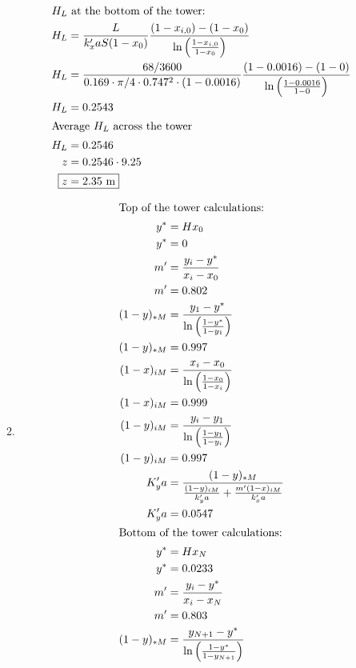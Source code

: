\documentclass[12pt]{article}
\begin{document}
\begin{enumerate}
\begin{enumerate}
\begin{align*}
            \intertext{$H_L$ at the bottom of the tower:}
            H_L &= \frac{L}{k_x'a S (1 - x_0)} \frac{(1 - x_{i,0}) - (1 - x_0)}{\ln\left(\frac{1 - x_{i,0}}{1 - x_0}\right)} \\
            H_L &= \frac{68 / 3600}{0.169 \cdot \pi/4 \cdot 0.747^2 \cdot (1 - 0.0016)} \frac{(1 - 0.0016) - (1 - 0)}{\ln\left(\frac{1 - 0.0016}{1 - 0}\right)} \\
            H_L &= 0.2543 \\
            \intertext{Average $H_L$ across the tower}
            H_L &= 0.2546 \\
            z &= 0.2546 \cdot 9.25 \\
            \Aboxed{z &= 2.35 \text{ m}}
        \end{align*}

        \item 
        \begin{align*}
            \intertext{Top of the tower calculations:}
            y^* &= H x_0 \\
            y^* &= 0 \\
            m' &= \frac{y_i - y^*}{x_i - x_0} \\
            m' &= 0.802 \\
            (1 - y)_{*M} &= \frac{y_1 - y^*}{\ln\left(\frac{1-y^*}{1-y_1}\right)} \\
            (1 - y)_{*M} &= 0.997 \\
            (1 - x)_{iM} &= \frac{x_i - x_0}{\ln\left(\frac{1-x_0}{1-x_i}\right)} \\
            (1 - x)_{iM} &= 0.999 \\
            (1 - y)_{iM} &= \frac{y_i - y_1}{\ln\left(\frac{1-y_1}{1-y_i}\right)} \\
            (1 - y)_{iM} &= 0.997 \\
            K_y'a &= \frac{(1 - y)_{*M}}{\frac{(1 - y)_{iM}}{k_y'a}+\frac{m'(1 - x)_{iM}}{k_x'a}} \\
            K_y'a &= 0.0547 \\
            \intertext{Bottom of the tower calculations:}
            y^* &= H x_N \\
            y^* &= 0.0233 \\
            m' &= \frac{y_i - y^*}{x_i - x_N} \\
            m' &= 0.803 \\
            (1 - y)_{*M} &= \frac{y_{N+1} - y^*}{\ln\left(\frac{1-y^*}{1-y_{N+1}}\right)} \\

\end{align*}
\end{enumerate}
\end{enumerate}
\end{document}
